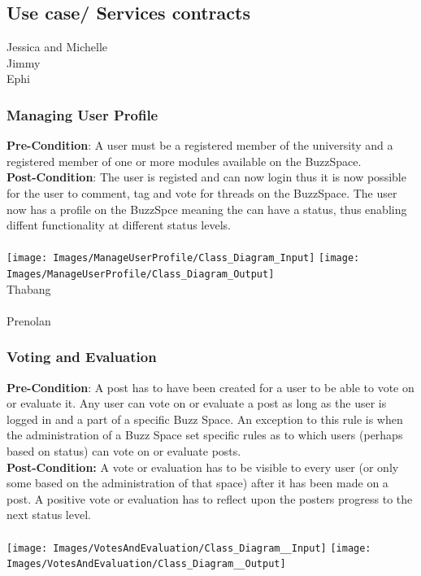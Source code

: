 \documentclass[a4paper,11pt]{article}
\begin{document}
\subsection{Use case/ Services contracts}
Jessica and Michelle\\
Jimmy\\
Ephi\\
\subsubsection{Managing User Profile}
\textbf{Pre-Condition}: A user must be a registered member of the university and a registered member of one or more modules available on the BuzzSpace.
\\
\textbf{Post-Condition}: The user is registed and can now login thus it is now possible for the user to comment, tag and vote for threads on the BuzzSpace. The user now has a profile on the BuzzSpce meaning the can have a status, thus enabling diffent functionality at different status levels.
\\
\\
\texttt{[image: Images/ManageUserProfile/Class\_Diagram\_Input]}
\texttt{[image: Images/ManageUserProfile/Class\_Diagram\_Output]}
\\
Thabang\\
\\
Prenolan
\subsubsection{Voting and Evaluation}
\textbf{Pre-Condition}: A post has to have been created for a user to be able to vote on or evaluate it. Any user can vote on or evaluate a post as long as the user is logged in and a part of a specific Buzz Space. An exception to this rule is when the administration of a Buzz Space set specific rules as to which users (perhaps based on status) can vote on or evaluate posts.
\\
\textbf{Post-Condition:} A vote or evaluation has to be visible to every user (or only some based on the administration of that space) after it has been made on a post. A positive vote or evaluation has to reflect upon the posters progress to the next status level.
\\
\\
\texttt{[image: Images/VotesAndEvaluation/Class\_Diagram\_\_Input]}
\texttt{[image: Images/VotesAndEvaluation/Class\_Diagram\_\_Output]}
\\
\end{document}
